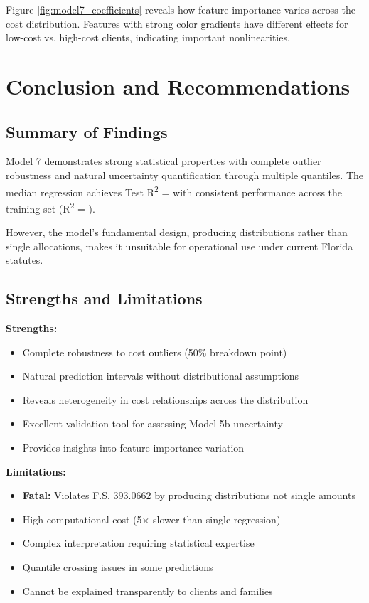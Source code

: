 Figure \ref{fig:model7_coefficients} reveals how feature importance varies across the cost distribution. Features with strong color gradients have different effects for low-cost vs. high-cost clients, indicating important nonlinearities.

\section{Conclusion and Recommendations}

\subsection{Summary of Findings}

Model 7 demonstrates strong statistical properties with complete outlier robustness and natural uncertainty quantification through multiple quantiles. The median regression achieves Test R\textsuperscript{2} = \ModelSevenRSquaredTest{} with consistent performance across the training set (R\textsuperscript{2} = \ModelSevenRSquaredTrain).

However, the model's fundamental design, producing distributions rather than single allocations, makes it unsuitable for operational use under current Florida statutes.

\subsection{Strengths and Limitations}

\textbf{Strengths:}
\begin{itemize}
\item Complete robustness to cost outliers (50\% breakdown point)
\item Natural prediction intervals without distributional assumptions
\item Reveals heterogeneity in cost relationships across the distribution
\item Excellent validation tool for assessing Model 5b uncertainty
\item Provides insights into feature importance variation
\end{itemize}

\textbf{Limitations:}
\begin{itemize}
\item \textbf{Fatal:} Violates F.S. 393.0662 by producing distributions not single amounts
\item High computational cost (5× slower than single regression)
\item Complex interpretation requiring statistical expertise
\item Quantile crossing issues in some predictions
\item Cannot be explained transparently to clients and families
\end{itemize}

